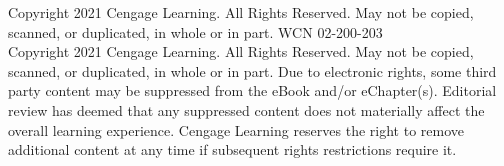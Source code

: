 \vfill
\begin{center}
  \tiny\color{stewartgray}%
  Copyright 2021 Cengage Learning. All Rights Reserved. May not be copied, scanned, or duplicated, in whole or in part.  WCN 02-200-203\\[1.5pt]
  Copyright 2021 Cengage Learning. All Rights Reserved. May not be copied, scanned, or duplicated, in whole or in part. Due to electronic rights, some third party content may be suppressed from the eBook and/or eChapter(s). Editorial review has deemed that any suppressed content does not materially affect the overall learning experience. Cengage Learning reserves the right to remove additional content at any time if subsequent rights restrictions require it.
\end{center}

